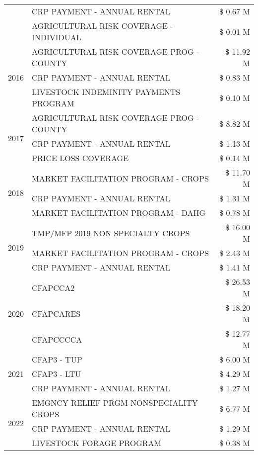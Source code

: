 \begin{tabular}{llr}
 & CRP PAYMENT - ANNUAL RENTAL & \$ 0.67 M \\
 & AGRICULTURAL RISK COVERAGE - INDIVIDUAL & \$ 0.01 M \\
\cline{1-3}
\multirow[t]{3}{*}{2016} & AGRICULTURAL RISK COVERAGE PROG - COUNTY & \$ 11.92 M \\
 & CRP PAYMENT - ANNUAL RENTAL & \$ 0.83 M \\
 & LIVESTOCK INDEMINITY PAYMENTS PROGRAM & \$ 0.10 M \\
\cline{1-3}
\multirow[t]{3}{*}{2017} & AGRICULTURAL RISK COVERAGE PROG - COUNTY & \$ 8.82 M \\
 & CRP PAYMENT - ANNUAL RENTAL & \$ 1.13 M \\
 & PRICE LOSS COVERAGE & \$ 0.14 M \\
\cline{1-3}
\multirow[t]{3}{*}{2018} & MARKET FACILITATION PROGRAM - CROPS & \$ 11.70 M \\
 & CRP PAYMENT - ANNUAL RENTAL & \$ 1.31 M \\
 & MARKET FACILITATION PROGRAM - DAHG & \$ 0.78 M \\
\cline{1-3}
\multirow[t]{3}{*}{2019} & TMP/MFP 2019 NON SPECIALTY CROPS & \$ 16.00 M \\
 & MARKET FACILITATION PROGRAM - CROPS & \$ 2.43 M \\
 & CRP PAYMENT - ANNUAL RENTAL & \$ 1.41 M \\
\cline{1-3}
\multirow[t]{3}{*}{2020} & CFAPCCA2 & \$ 26.53 M \\
 & CFAPCARES & \$ 18.20 M \\
 & CFAPCCCCA & \$ 12.77 M \\
\cline{1-3}
\multirow[t]{3}{*}{2021} & CFAP3 - TUP & \$ 6.00 M \\
 & CFAP3 - LTU & \$ 4.29 M \\
 & CRP PAYMENT - ANNUAL RENTAL & \$ 1.27 M \\
\cline{1-3}
\multirow[t]{3}{*}{2022} & EMGNCY RELIEF PRGM-NONSPECIALITY CROPS & \$ 6.77 M \\
 & CRP PAYMENT - ANNUAL RENTAL & \$ 1.29 M \\
 & LIVESTOCK FORAGE PROGRAM & \$ 0.38 M \\
\cline{1-3}
\bottomrule
\end{tabular}
